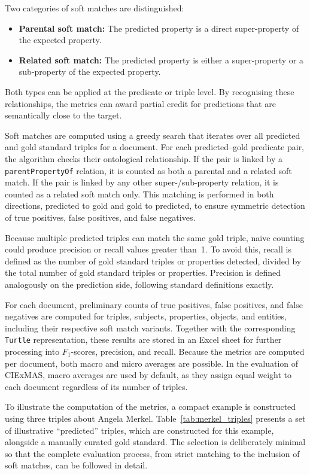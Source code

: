 \documentclass[a4paper,oneside,bibliography=totoc]{scrbook}
\begin{document}
Two categories of soft matches are distinguished:
\begin{itemize}
  \item \textbf{Parental soft match:} The predicted property is a direct super-property of the expected property.
  \item \textbf{Related soft match:} The predicted property is either a super-property or a sub-property of the expected property.
\end{itemize}
Both types can be applied at the predicate or triple level. By recognising these relationships, the metrics can award partial credit for predictions that are semantically close to the target.

Soft matches are computed using a greedy search that iterates over all predicted and gold standard triples for a document. For each predicted–gold predicate pair, the algorithm checks their ontological relationship. If the pair is linked by a \texttt{parentPropertyOf} relation, it is counted as both a parental and a related soft match. If the pair is linked by any other super-/sub-property relation, it is counted as a related soft match only. This matching is performed in both directions, predicted to gold and gold to predicted, to ensure symmetric detection of true positives, false positives, and false negatives.

Because multiple predicted triples can match the same gold triple, naive counting could produce precision or recall values greater than~1. To avoid this, recall is defined as the number of gold standard triples or properties detected, divided by the total number of gold standard triples or properties. Precision is defined analogously on the prediction side, following standard definitions exactly.

For each document, preliminary counts of true positives, false positives, and false negatives are computed for triples, subjects, properties, objects, and entities, including their respective soft match variants. Together with the corresponding \texttt{Turtle} representation, these results are stored in an Excel sheet for further processing into $F_1$-scores, precision, and recall. Because the metrics are computed per document, both macro and micro averages are possible. In the evaluation of CIExMAS, macro averages are used by default, as they assign equal weight to each document regardless of its number of triples.

To illustrate the computation of the metrics, a compact example is constructed using three triples about Angela Merkel. Table~\ref{tab:merkel_triples} presents a set of illustrative \enquote{predicted} triples, which are constructed for this example, alongside a manually curated gold standard. The selection is deliberately minimal so that the complete evaluation process, from strict matching to the inclusion of soft matches, can be followed in detail.
\end{document}
